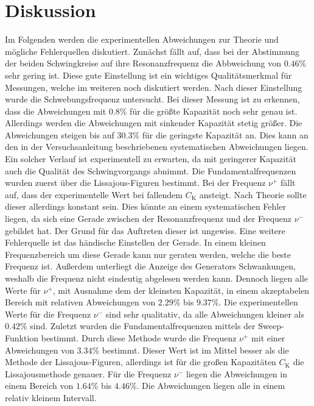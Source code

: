 \section{Diskussion}
\label{sec:Diskussion}
Im Folgenden werden die experimentellen Abweichungen zur Theorie und mögliche Fehlerquellen diskutiert.
Zunächst fällt auf, dass bei der Abstimmung der beiden Schwingkreise auf ihre Resonanzfrequenz die Abbweichung von $0.46\%$ sehr gering ist. Diese gute Einstellung ist ein wichtiges Qualitätsmerkmal
für Messungen, welche im weiteren noch diskutiert werden. Nach dieser Einstellung wurde die Schwebungsfrequenz untersucht. Bei dieser Messung ist zu erkennen, dass die Abweichungen mit $0.8\%$ für
die größte Kapazität noch sehr genau ist. Allerdings werden die Abweichungen mit sinkender Kapazität stetig größer. Die Abweichungen steigen bis auf $30.3\%$ für die geringste Kapazität an. Dies 
kann an den in der Versuchsanleitung \cite{v355} beschriebenen systematischen Abweichungen liegen. Ein solcher Verlauf ist experimentell zu erwarten, da mit geringerer Kapazität 
auch die Qualität des Schwingvorgangs abnimmt. Die Fundamentalfrequenzen wurden zuerst über die Lissajous-Figuren bestimmt. Bei der Frequenz $\nu^+$ fällt auf, dass der experimentelle Wert
bei fallendem $C_\text{K}$ ansteigt. Nach Theorie sollte dieser allerdings konstant sein. Dies könnte an einem systematischen Fehler liegen, da sich eine Gerade zwischen der Resonanzfrequenz und der Frequenz
$\nu^-$ gebildet hat. Der Grund für das Auftreten dieser ist ungewiss. Eine weitere Fehlerquelle ist das händische Einstellen der Gerade. In einem kleinen Frequenzbereich um diese Gerade kann nur geraten werden, 
welche die beste Frequenz ist. Außerdem unterliegt die Anzeige des Generators Schwankungen, weshalb die Frequenz nicht eindeutig abgelesen werden kann. Dennoch liegen alle Werte
für $\nu^+$, mit Ausnahme dem der kleinsten Kapazität, in einem akzeptabelen Bereich mit relativen Abweichungen von $2.29\%$ bis $9.37\%$. Die experimentellen Werte für die Frequenz $\nu^-$ sind sehr 
qualitativ, da alle Abweichungen kleiner als $0.42\%$ sind. Zuletzt wurden die Fundamentalfrequenzen mittels der Sweep-Funktion bestimmt. Durch diese Methode wurde die Frequenz $\nu^+$ mit einer 
Abweichungen von $3.34\%$ bestimmt. Dieser Wert ist im Mittel besser als die Methode der Lissajous-Figuren, allerdings ist für die großen Kapazitäten
$C_\text{K}$ die Lissajousmethode genauer. Für die Frequenz $\nu^-$ liegen die Abweichungen in einem Bereich von $1.64\%$ bis $4.46\%$. Die Abweichungen liegen alle in einem relativ kleinem Intervall. 

